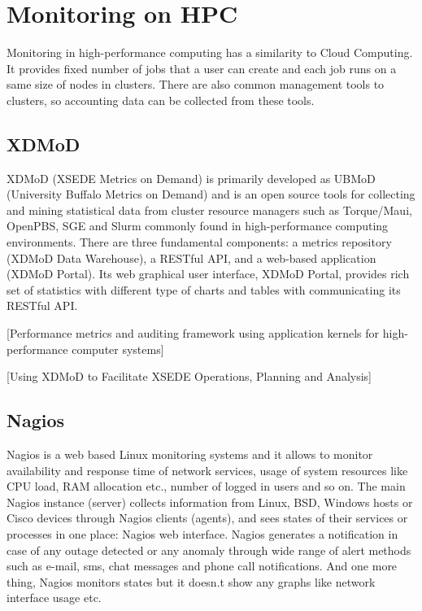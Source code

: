 \documentclass{sig-alternate}
\begin{document}
\section{Monitoring on HPC}

Monitoring in high-performance computing has a similarity to Cloud Computing. It provides fixed number of jobs that a user can create and each job runs on a same size of nodes in clusters. There are also common management tools to clusters, so accounting data can be collected from these tools.

\subsection{XDMoD}

XDMoD (XSEDE Metrics on Demand) is primarily developed as UBMoD (University Buffalo Metrics on Demand) and is an open source tools for collecting and mining statistical data from cluster resource managers such as Torque/Maui, OpenPBS, SGE and Slurm commonly found in high-performance computing environments. There are three fundamental components: a metrics repository (XDMoD Data Warehouse), a RESTful API, and a web-based application (XDMoD Portal). Its web graphical user interface, XDMoD Portal, provides rich set of statistics with different type of charts and tables with communicating its RESTful API.

[Performance metrics and auditing framework using application kernels for high-performance computer systems]

[Using XDMoD to Facilitate XSEDE Operations, Planning and Analysis]

\subsection{Nagios}

Nagios is a web based Linux monitoring systems and it allows to monitor availability and response time of network services, usage of system resources like CPU load, RAM allocation etc., number of logged in users and so on. The main Nagios instance (server) collects information from Linux, BSD, Windows hosts or Cisco devices through Nagios clients (agents), and sees states of their services or processes in one place: Nagios web interface. Nagios generates a notification in case of any outage detected or any anomaly through wide range of alert methods such as e-mail, sms, chat messages and phone call notifications. And one more thing, Nagios monitors states but it doesn.t show any graphs like network interface usage etc.
\end{document}
